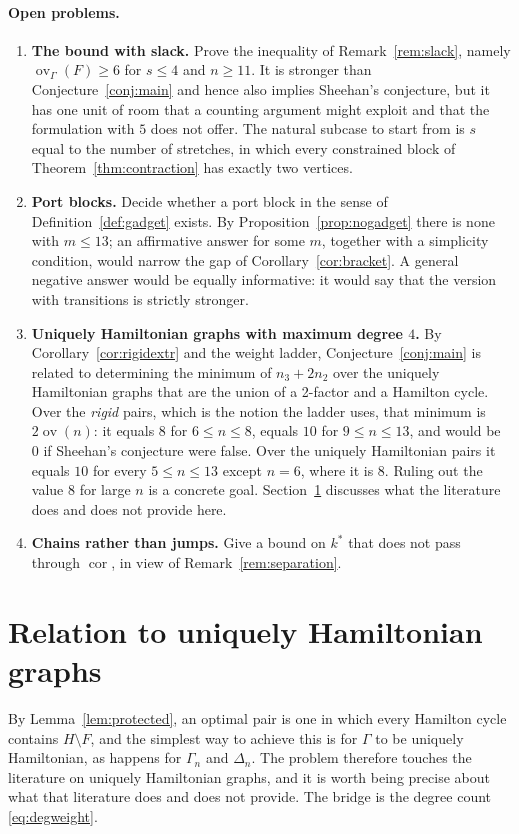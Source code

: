 \documentclass[11pt,a4paper]{article}
\theoremstyle{definition}
\theoremstyle{remark}
\newcommand{\ov}{\operatorname{ov}}
\newcommand{\cor}{\operatorname{cor}}
\begin{document}
\paragraph{Open problems.}
\begin{enumerate}
\item \textbf{The bound with slack.} Prove the inequality of Remark~\ref{rem:slack}, namely $\ov_\Gamma(F)\ge6$ for $s\le4$ and $n\ge11$. It is stronger than Conjecture~\ref{conj:main} and hence also implies Sheehan's conjecture, but it has one unit of room that a counting argument might exploit and that the formulation with $5$ does not offer. The natural subcase to start from is $s$ equal to the number of stretches, in which every constrained block of Theorem~\ref{thm:contraction} has exactly two vertices.
\item \textbf{Port blocks.} Decide whether a port block in the sense of Definition~\ref{def:gadget} exists. By Proposition~\ref{prop:nogadget} there is none with $m\le13$; an affirmative answer for some $m$, together with a simplicity condition, would narrow the gap of Corollary~\ref{cor:bracket}. A general negative answer would be equally informative: it would say that the version with transitions is strictly stronger.
\item \textbf{Uniquely Hamiltonian graphs with maximum degree $4$.} By Corollary~\ref{cor:rigidextr} and the weight ladder, Conjecture~\ref{conj:main} is related to determining the minimum of $n_3+2n_2$ over the uniquely Hamiltonian graphs that are the union of a 2-factor and a Hamilton cycle. Over the \emph{rigid} pairs, which is the notion the ladder uses, that minimum is $2\ov(n)$: it equals $8$ for $6\le n\le8$, equals $10$ for $9\le n\le13$, and would be $0$ if Sheehan's conjecture were false. Over the uniquely Hamiltonian pairs it equals $10$ for every $5\le n\le13$ except $n=6$, where it is $8$. Ruling out the value $8$ for large $n$ is a concrete goal. Section~\ref{sec:uh} discusses what the literature does and does not provide here.
\item \textbf{Chains rather than jumps.} Give a bound on $k^*$ that does not pass through $\cor$, in view of Remark~\ref{rem:separation}.
\end{enumerate}

\section{Relation to uniquely Hamiltonian graphs}\label{sec:uh}

By Lemma~\ref{lem:protected}, an optimal pair is one in which every Hamilton cycle contains $H\setminus F$, and the simplest way to achieve this is for $\Gamma$ to be uniquely Hamiltonian, as happens for $\Gamma_n$ and $\Delta_n$. The problem therefore touches the literature on uniquely Hamiltonian graphs, and it is worth being precise about what that literature does and does not provide. The bridge is the degree count \eqref{eq:degweight}.
\end{document}
